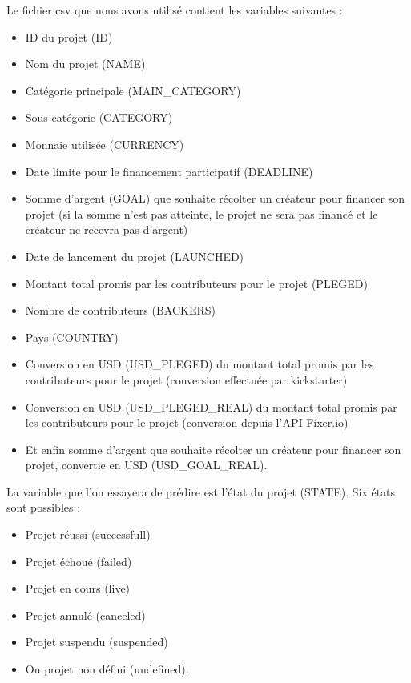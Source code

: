 \documentclass{article}
\begin{document}
\noindent Le fichier csv que nous avons utilisé contient les variables suivantes : \newline 
\begin{itemize}
    \item ID du projet (ID)
    \item Nom du projet (NAME)
    \item Catégorie principale (MAIN\_CATEGORY)
    \item Sous-catégorie (CATEGORY)
    \item Monnaie utilisée (CURRENCY)
    \item Date limite pour le financement participatif (DEADLINE)
    \item Somme d'argent (GOAL) que souhaite récolter un créateur pour financer son projet (si la somme n'est pas atteinte, le projet ne sera pas financé et le créateur ne recevra pas d'argent)
    \item Date de lancement du projet (LAUNCHED)
    \item Montant total promis par les contributeurs pour le projet (PLEGED)
    \item Nombre de contributeurs (BACKERS)
    \item Pays (COUNTRY)
    \item Conversion en USD (USD\_PLEGED) du montant total promis par les contributeurs pour le projet (conversion effectuée par kickstarter) 
    \item Conversion en USD (USD\_PLEGED\_REAL) du montant total promis par les contributeurs pour le projet (conversion depuis l'API Fixer.io)
    \item Et enfin somme d'argent que souhaite récolter un créateur pour financer son projet, convertie en USD (USD\_GOAL\_REAL).\newline 

\end{itemize}

\noindent La variable que l'on essayera de prédire est l'état du projet (STATE). Six états sont possibles :

\begin{itemize}
    \item Projet réussi (successfull)
    \item Projet échoué (failed)
    \item Projet en cours (live)
    \item Projet annulé (canceled)
    \item Projet suspendu (suspended)
    \item Ou projet non défini (undefined).\newline 
\end{itemize}
\end{document}
